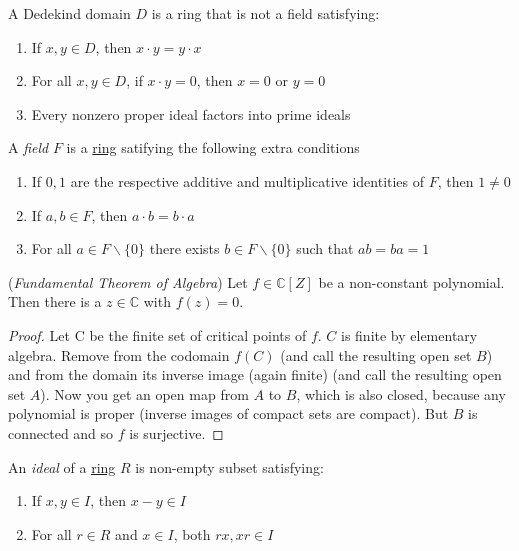 \begin{definition} \label{dedekind} %
  A Dedekind domain $D$ is a ring that is not a field satisfying:
  \begin{enumerate}
    \item If $x,y \in D$, then $x \cdot y = y \cdot x$
    \item For all $x,y \in D $, if $x\cdot y = 0$, then $x = 0 $ or $y = 0$
    \item Every nonzero proper ideal factors into prime ideals 
  \end{enumerate}
\end{definition}

\begin{definition} \label{field} %
  A \emph{field} $F$ is a \hyperref[ring]{ring} satifying the following extra conditions
  \begin{enumerate}
    \item If $0,1$ are the respective additive and multiplicative identities of $F$, then $1 \neq 0$
    \item If $a,b \in F$, then $a\cdot b = b \cdot a$ 
    \item For all $a \in F \backslash \lbrace 0 \rbrace $ there exists $b \in F \backslash \lbrace 0 \rbrace $ such that $ab = ba = 1$
  \end{enumerate}
\end{definition}

\begin{theorem} \label{fun} (\textit{Fundamental Theorem of Algebra})
  Let $f \in \mathbb{C}[Z]$ be a non-constant polynomial.  Then there is a $z\in\mathbb{C}$ with $f(z)=0$.
\end{theorem}

\begin{proof}
  Let C be the finite set of critical points of $f$. $C$ is finite by elementary algebra. Remove from the codomain $f(C)$ (and call the resulting open set $B$) and from the domain its inverse image (again finite) (and call the resulting open set $A$). Now you get an open map from $A$ to $B$, which is also closed, because any polynomial is proper (inverse images of compact sets are compact). But $B$ is connected and so $f$ is surjective.
\end{proof}

\begin{definition} \label{ideal} %
  An \emph{ideal} of a \hyperref[ring]{ring} $R$ is non-empty subset satisfying: 
  \begin{enumerate}
    \item If $x,y \in I$, then $x - y \in I$ 
    \item For all $r \in R$ and $x \in I$, both $rx,xr \in I$
  \end{enumerate}
\end{definition}

